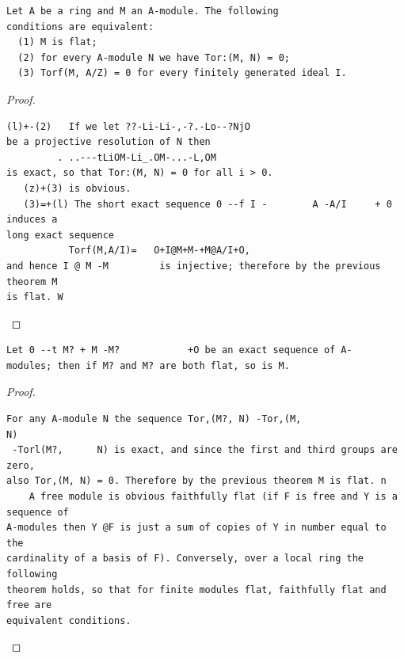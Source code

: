 \begin{theorem}\label{mcrt-auto-theorem-7-8}\uses{}
\begin{verbatim}
Let A be a ring and M an A-module. The following
conditions are equivalent:
  (1) M is flat;
  (2) for every A-module N we have Tor:(M, N) = 0;
  (3) Torf(M, A/Z) = 0 for every finitely generated ideal I.
\end{verbatim}
\end{theorem}
\begin{proof}
\begin{verbatim}
(l)+-(2)   If we let ??-Li-Li-,-?.-Lo--?NjO
be a projective resolution of N then
         . ..---tLiOM-Li_.OM-...-L,OM
is exact, so that Tor:(M, N) = 0 for all i > 0.
   (z)+(3) is obvious.
   (3)=+(l) The short exact sequence 0 --f I -        A -A/I     + 0 induces a
long exact sequence
           Torf(M,A/I)=   O+I@M+M-+M@A/I+O,
and hence I @ M -M         is injective; therefore by the previous theorem M
is flat. W
\end{verbatim}
\end{proof}


\begin{theorem}\label{mcrt-auto-theorem-7-9}\uses{}
\begin{verbatim}
Let 0 --t M? + M -M?            +O be an exact sequence of A-
modules; then if M? and M? are both flat, so is M.
\end{verbatim}
\end{theorem}
\begin{proof}
\begin{verbatim}
For any A-module N the sequence Tor,(M?, N) -Tor,(M,                     N)
 -Torl(M?,      N) is exact, and since the first and third groups are zero,
also Tor,(M, N) = 0. Therefore by the previous theorem M is flat. n
    A free module is obvious faithfully flat (if F is free and Y is a sequence of
A-modules then Y @F is just a sum of copies of Y in number equal to the
cardinality of a basis of F). Conversely, over a local ring the following
theorem holds, so that for finite modules flat, faithfully flat and free are
equivalent conditions.
\end{verbatim}
\end{proof}


